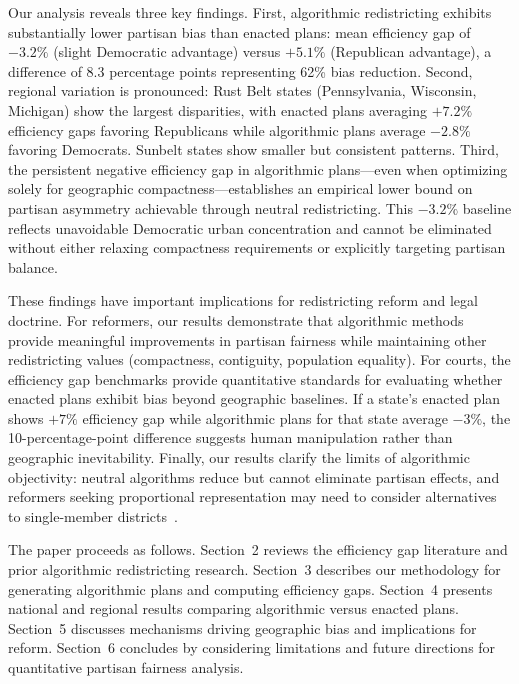 Our analysis reveals three key findings. First, algorithmic redistricting exhibits substantially lower partisan bias than enacted plans: mean efficiency gap of $-3.2\%$ (slight Democratic advantage) versus $+5.1\%$ (Republican advantage), a difference of 8.3 percentage points representing 62\% bias reduction. Second, regional variation is pronounced: Rust Belt states (Pennsylvania, Wisconsin, Michigan) show the largest disparities, with enacted plans averaging $+7.2\%$ efficiency gaps favoring Republicans while algorithmic plans average $-2.8\%$ favoring Democrats. Sunbelt states show smaller but consistent patterns. Third, the persistent negative efficiency gap in algorithmic plans—even when optimizing solely for geographic compactness—establishes an empirical lower bound on partisan asymmetry achievable through neutral redistricting. This $-3.2\%$ baseline reflects unavoidable Democratic urban concentration and cannot be eliminated without either relaxing compactness requirements or explicitly targeting partisan balance.

These findings have important implications for redistricting reform and legal doctrine. For reformers, our results demonstrate that algorithmic methods provide meaningful improvements in partisan fairness while maintaining other redistricting values (compactness, contiguity, population equality). For courts, the efficiency gap benchmarks provide quantitative standards for evaluating whether enacted plans exhibit bias beyond geographic baselines. If a state's enacted plan shows $+7\%$ efficiency gap while algorithmic plans for that state average $-3\%$, the 10-percentage-point difference suggests human manipulation rather than geographic inevitability. Finally, our results clarify the limits of algorithmic objectivity: neutral algorithms reduce but cannot eliminate partisan effects, and reformers seeking proportional representation may need to consider alternatives to single-member districts~\cite{mcghee2020fairness}.

The paper proceeds as follows. Section~2 reviews the efficiency gap literature and prior algorithmic redistricting research. Section~3 describes our methodology for generating algorithmic plans and computing efficiency gaps. Section~4 presents national and regional results comparing algorithmic versus enacted plans. Section~5 discusses mechanisms driving geographic bias and implications for reform. Section~6 concludes by considering limitations and future directions for quantitative partisan fairness analysis.
